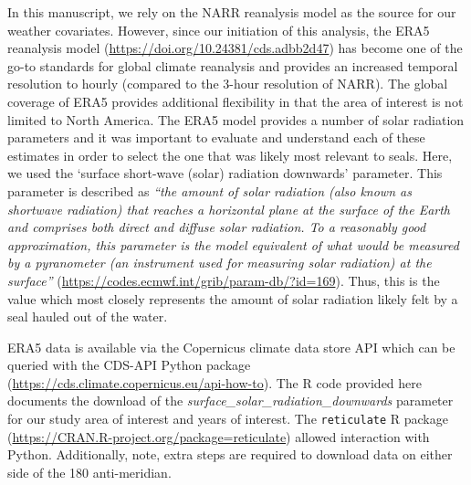 \documentclass[fleqn,10pt,lineno]{wlpeerj} %
\begin{document}
In this manuscript, we rely on the NARR reanalysis model as the source for our
weather covariates. However, since our initiation of this analysis, the ERA5
reanalysis model (\url{https://doi.org/10.24381/cds.adbb2d47}) has become one of the
go-to standards for global climate reanalysis and provides an increased temporal
resolution to hourly (compared to the 3-hour resolution of NARR). The global
coverage of ERA5 provides additional flexibility in that the area of interest is
not limited to North America. The ERA5 model provides a number of solar
radiation parameters and it was important to evaluate and understand each of
these estimates in order to select the one that was likely most relevant to
seals. Here, we used the `surface short-wave (solar) radiation downwards'
parameter. This
parameter is described as \emph{``the amount of solar radiation (also known as shortwave radiation)
that reaches a horizontal plane at the surface of the Earth and comprises both
direct and diffuse solar radiation. To a reasonably good approximation, this
parameter is the model equivalent of what would be measured by a pyranometer (an
instrument used for measuring solar radiation) at the surface''}
(\url{https://codes.ecmwf.int/grib/param-db/?id=169}). Thus, this is the
value which most closely represents the amount of solar radiation likely
felt by a seal hauled out of the water.

ERA5 data is available via the Copernicus climate data store API which can be
queried with the CDS-API Python package
(\url{https://cds.climate.copernicus.eu/api-how-to}). The R code provided here
documents the download of the \emph{surface\_solar\_radiation\_downwards} parameter for
our study area of interest and years of interest. The \texttt{reticulate} R package
(\url{https://CRAN.R-project.org/package=reticulate}) allowed interaction with Python.
Additionally, note, extra steps are required to download data on either side
of the 180 anti-meridian.
\end{document}
